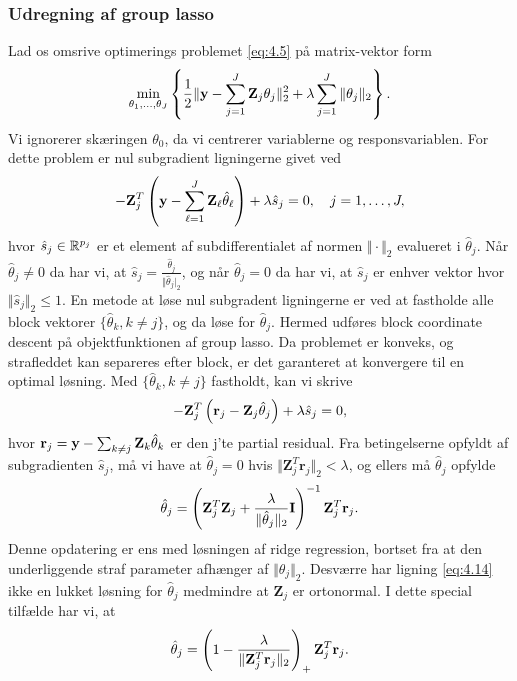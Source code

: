 \subsubsection{Udregning af group lasso}
Lad os omsrive optimerings problemet \eqref{eq:4.5} på matrix-vektor form
\begin{align*}
\min_{\theta_1, \ldots, \theta_J} \cbr{\frac{1}{2} \Vert \y - \sum_{j=1}^J \mathbf{Z}_{j} \theta_j \Vert_2^2 + \lambda \sum_{j=1}^J \Vert \theta_j \Vert_2}.
\end{align*}
Vi ignorerer skæringen $\theta_0$, da vi centrerer variablerne og responsvariablen.
For dette problem er nul subgradient ligningerne givet ved
\begin{align*}
- \mathbf{Z}_{j}^T \del{\y - \sum_{\ell=1}^J \mathbf{Z}_\ell \hat{\theta}_\ell} + \lambda \hat{s}_j = 0, \quad j=1,\ldots, J,
\end{align*} 
hvor $\hat{s}_j \in \mathbb{R}^{p_j}$ er et element af subdifferentialet af normen $\Vert \cdot \Vert_2$ evalueret i $\hat{\theta}_j$.
Når $\hat{\theta}_j \neq 0$ da har vi, at $\hat{s}_j = \frac{\hat{\theta}_j}{\Vert \hat{\theta}_j \vert_2}$, og når $\hat{\theta}_j=0$ da har vi, at $\hat{s}_j$ er enhver vektor hvor $\Vert \hat{s}_j \Vert_2 \leq 1$.
En metode at løse nul subgradent ligningerne er ved at fastholde alle block vektorer $\{\hat{\theta}_k, k \neq j\}$, og da løse for $\hat{\theta}_j$.
Hermed udføres block coordinate descent på objektfunktionen af group lasso.
Da problemet er konveks, og strafleddet kan separeres efter block, er det garanteret at konvergere til en optimal løsning.
Med $\{\hat{\theta}_k, k \neq j\}$ fastholdt, kan vi skrive
\begin{align*}
- \mathbf{Z}_{j}^T \del{\mathbf{r}_j - \mathbf{Z}_j \hat{\theta}_j} + \lambda \hat{s}_j = 0,
\end{align*}
hvor $\mathbf{r}_j = \mathbf{y} - \sum_{k \neq j} \mathbf{Z}_k \hat{\theta}_k $ er den j'te partial residual.
Fra betingelserne opfyldt af subgradienten $\hat{s}_j$, må vi have at $\hat{\theta}_j =0$ hvis $\Vert \mathbf{Z}_j^T \mathbf{r}_j \Vert_2 < \lambda$, og ellers må $\hat{\theta}_j$ opfylde
\begin{align}
\hat{\theta}_j = \del{\mathbf{Z}_j^T \mathbf{Z}_j + \frac{\lambda}{\Vert \hat{\theta}_j \Vert_2} \mathbf{I}}^{-1} \mathbf{Z}_j^T \mathbf{r}_j. \label{eq:4.14}
\end{align}
Denne opdatering er ens med løsningen af ridge regression, bortset fra at den underliggende straf parameter afhænger af $\Vert \hat{\theta}_j \Vert_2$.
Desværre har ligning \eqref{eq:4.14} ikke en lukket løsning for $\hat{\theta}_j$ medmindre at $\mathbf{Z}_j$ er ortonormal. I dette special tilfælde har vi, at
\begin{align*}
\hat{\theta}_j = \del{1 - \frac{\lambda}{\Vert \mathbf{Z}_j^T \mathbf{r}_j \Vert_2}}_+  \mathbf{Z}_j^T \mathbf{r}_j.
\end{align*}

